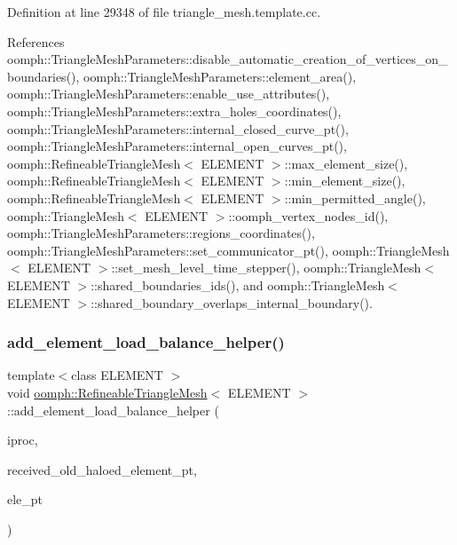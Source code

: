 Definition at line 29348 of file triangle\+\_\+mesh.\+template.\+cc.



References oomph\+::\+Triangle\+Mesh\+Parameters\+::disable\+\_\+automatic\+\_\+creation\+\_\+of\+\_\+vertices\+\_\+on\+\_\+boundaries(), oomph\+::\+Triangle\+Mesh\+Parameters\+::element\+\_\+area(), oomph\+::\+Triangle\+Mesh\+Parameters\+::enable\+\_\+use\+\_\+attributes(), oomph\+::\+Triangle\+Mesh\+Parameters\+::extra\+\_\+holes\+\_\+coordinates(), oomph\+::\+Triangle\+Mesh\+Parameters\+::internal\+\_\+closed\+\_\+curve\+\_\+pt(), oomph\+::\+Triangle\+Mesh\+Parameters\+::internal\+\_\+open\+\_\+curves\+\_\+pt(), oomph\+::\+Refineable\+Triangle\+Mesh$<$ E\+L\+E\+M\+E\+N\+T $>$\+::max\+\_\+element\+\_\+size(), oomph\+::\+Refineable\+Triangle\+Mesh$<$ E\+L\+E\+M\+E\+N\+T $>$\+::min\+\_\+element\+\_\+size(), oomph\+::\+Refineable\+Triangle\+Mesh$<$ E\+L\+E\+M\+E\+N\+T $>$\+::min\+\_\+permitted\+\_\+angle(), oomph\+::\+Triangle\+Mesh$<$ E\+L\+E\+M\+E\+N\+T $>$\+::oomph\+\_\+vertex\+\_\+nodes\+\_\+id(), oomph\+::\+Triangle\+Mesh\+Parameters\+::regions\+\_\+coordinates(), oomph\+::\+Triangle\+Mesh\+Parameters\+::set\+\_\+communicator\+\_\+pt(), oomph\+::\+Triangle\+Mesh$<$ E\+L\+E\+M\+E\+N\+T $>$\+::set\+\_\+mesh\+\_\+level\+\_\+time\+\_\+stepper(), oomph\+::\+Triangle\+Mesh$<$ E\+L\+E\+M\+E\+N\+T $>$\+::shared\+\_\+boundaries\+\_\+ids(), and oomph\+::\+Triangle\+Mesh$<$ E\+L\+E\+M\+E\+N\+T $>$\+::shared\+\_\+boundary\+\_\+overlaps\+\_\+internal\+\_\+boundary().

\mbox{\label{classoomph_1_1RefineableTriangleMesh_aaab12a2182859c1a8f4ece3752116944}} 
\subsubsection{\texorpdfstring{add\+\_\+element\+\_\+load\+\_\+balance\+\_\+helper()}{add\_element\_load\_balance\_helper()}}
{\footnotesize\ttfamily template$<$class E\+L\+E\+M\+E\+NT $>$ \\
void \hyperlink{classoomph_1_1RefineableTriangleMesh}{oomph\+::\+Refineable\+Triangle\+Mesh}$<$ E\+L\+E\+M\+E\+NT $>$\+::add\+\_\+element\+\_\+load\+\_\+balance\+\_\+helper (\begin{DoxyParamCaption}\item[{const unsigned \&}]{iproc,  }\item[{Vector$<$ Vector$<$ std\+::map$<$ unsigned, Finite\+Element $\ast$$>$ $>$ $>$ \&}]{received\+\_\+old\+\_\+haloed\+\_\+element\+\_\+pt,  }\item[{Finite\+Element $\ast$}]{ele\+\_\+pt }\end{DoxyParamCaption})\hspace{0.3cm}{\ttfamily [protected]}}



